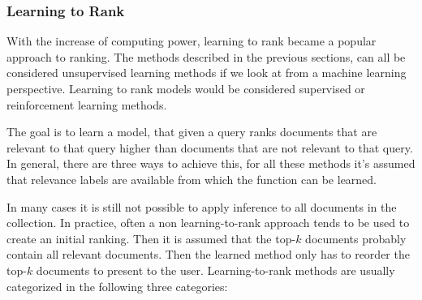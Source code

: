 \subsubsection{Learning to Rank}
With the increase of computing power, learning to rank became a popular approach to ranking. The methods described in the previous sections, can all be considered unsupervised learning methods if we look at from a machine learning perspective. Learning to rank models would be considered supervised or reinforcement learning methods. 

The goal is to learn a model, that given a query ranks documents that are relevant to that query higher than documents that are not relevant to that query. In general, there are three ways to achieve this, for all these methods it's assumed that relevance labels are available from which the function can be learned.

In many cases it is still not possible to apply inference to all documents in the collection. In practice, often a non learning-to-rank approach tends to be used to create an initial ranking. Then it is assumed that the top-$k$ documents probably contain all relevant documents. Then the learned method only has to reorder the top-$k$ documents to present to the user. Learning-to-rank methods are usually categorized in the following three categories: 

